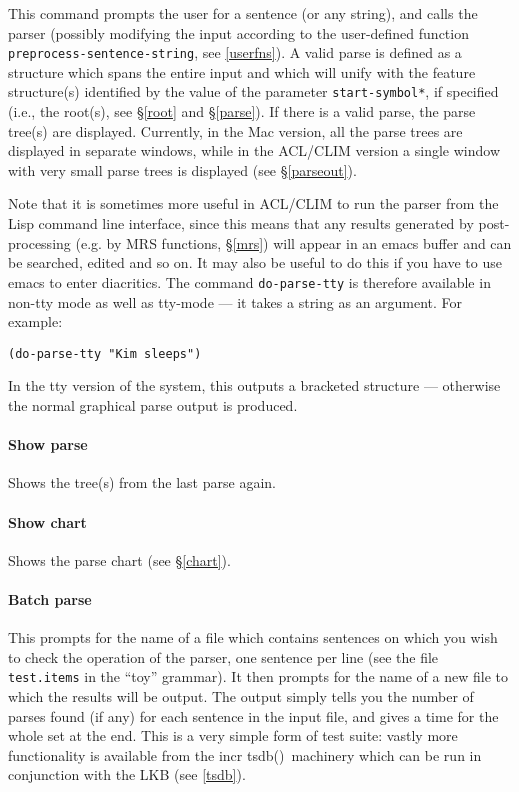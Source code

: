\documentclass[12pt]{report}
\newcommand{\itsdb}{{\sf \lbrack incr tsdb()\rbrack}}
\begin{document}
This command prompts the user for a sentence (or any string), and calls the
parser 
(possibly modifying the input according to the
user-defined function {\tt preprocess-sentence-string}, see \ref{userfns}).
A valid parse is defined as a structure which spans the entire input
and which will unify with the feature structure(s) 
identified by the value of the parameter {\tt *start-symbol*},
if specified
(i.e., the root(s), see \S\ref{root} and \S\ref{parse}).
If there is a valid parse,
the parse tree(s) are displayed.  Currently, in the Mac version,
all the parse trees are displayed in separate windows, while in
the ACL/CLIM version a single window with very small parse trees 
is displayed (see \S\ref{parseout}).

Note that it is sometimes more useful in ACL/CLIM
to run the parser from the Lisp
command line interface, since this means that
any results generated
by post-processing (e.g. by MRS functions, \S\ref{mrs}) will appear in an 
emacs buffer and can be searched, edited and so on.
It may also be useful to do this
if you have to use emacs to enter diacritics.
The command {\tt do-parse-tty} is therefore available in
non-tty mode as well as tty-mode --- it takes a string as an argument.
For example:
\begin{verbatim}
(do-parse-tty "Kim sleeps")
\end{verbatim}
In the tty version of the system, this outputs a bracketed
structure --- otherwise the normal graphical parse output is produced.

\paragraph{Show parse}
Shows the tree(s) from the last parse again.  

\paragraph{Show chart}
Shows the parse chart (see \S\ref{chart}).

\paragraph{Batch parse}
This prompts for the name of a file which contains sentences
on which you wish to check the operation of the parser,
one sentence per line (see the file {\tt test.items} in the
``toy'' grammar).  It then prompts for the name of a new file
to which the results will be output.  The output simply tells you
the number of parses found (if any) for each sentence in the
input file, and gives a time for the whole set at the end.
This is a very simple form of test suite: vastly 
more functionality is available from the \itsdb\ machinery which
can be run in conjunction with the LKB (see \ref{tsdb}).
\end{document}
